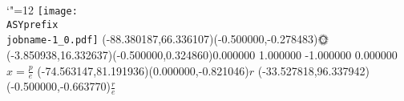 \setlength{\unitlength}{1pt}
\makeatletter%
\let\ASYencoding\f@encoding%
\let\ASYfamily\f@family%
\let\ASYseries\f@series%
\let\ASYshape\f@shape%
\makeatother%
%
{\catcode`"=12%
\texttt{[image: \\ASYprefix\\jobname-1\_0.pdf]}%
}%
\color{ASYcolor}
\fontsize{12.000000}{14.400000}\selectfont
\usefont{\ASYencoding}{\ASYfamily}{\ASYseries}{\ASYshape}%
\ASYalign(-88.380187,66.336107)(-0.500000,-0.278483){🌞}%
\color{ASYcolor}
\fontsize{12.000000}{14.400000}\selectfont
\ASYalignT(-3.850938,16.332637)(-0.500000,0.324860){0.000000 1.000000 -1.000000 0.000000}{$x=\frac p e$}%
\color{ASYcolor}
\fontsize{12.000000}{14.400000}\selectfont
\ASYalign(-74.563147,81.191936)(0.000000,-0.821046){$r$}%
\color{ASYcolor}
\fontsize{12.000000}{14.400000}\selectfont
\ASYalign(-33.527818,96.337942)(-0.500000,-0.663770){$\frac r e$}%
